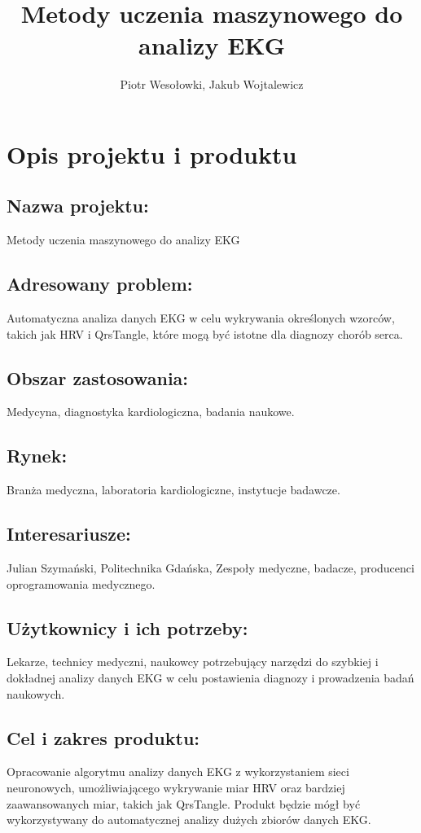 \documentclass[12pt]{article}
\title{Metody uczenia maszynowego do analizy EKG}
\author{Piotr Wesołowki, Jakub Wojtalewicz}
\begin{document}
    \maketitle

    \section{Opis projektu i produktu}

        \subsection*{Nazwa projektu:} 
            Metody uczenia maszynowego do analizy EKG

        \subsection*{Adresowany problem:}
            Automatyczna analiza danych EKG w celu wykrywania określonych wzorców, takich jak HRV i QrsTangle, które mogą być istotne dla diagnozy chorób serca.

        \subsection*{Obszar zastosowania:}
            Medycyna, diagnostyka kardiologiczna, badania naukowe.

        \subsection*{Rynek:}
            Branża medyczna, laboratoria kardiologiczne, instytucje badawcze.

        \subsection*{Interesariusze:}
            Julian Szymański, Politechnika Gdańska, Zespoły medyczne, badacze, producenci oprogramowania medycznego.

        \subsection*{Użytkownicy i ich potrzeby:}
            Lekarze, technicy medyczni, naukowcy potrzebujący narzędzi do szybkiej i dokładnej analizy danych EKG w celu postawienia diagnozy i prowadzenia badań naukowych.

        \subsection*{Cel i zakres produktu:}  
            Opracowanie algorytmu analizy danych EKG z wykorzystaniem sieci neuronowych, umożliwiającego wykrywanie miar HRV oraz bardziej zaawansowanych miar, takich jak QrsTangle. Produkt będzie mógł być wykorzystywany do automatycznej analizy dużych zbiorów danych EKG.  
\end{document}
